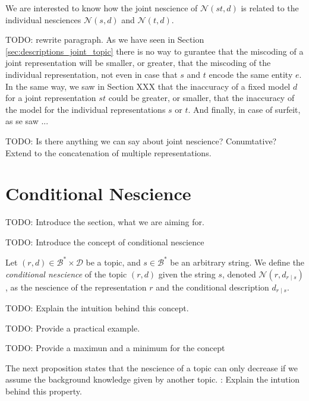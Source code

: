 We are interested to know how the joint nescience of $\mathcal{N} (st, d)$ is related to the individual nesciences $\mathcal{N} (s, d)$ and $\mathcal{N} (t, d)$.

{\color{red} TODO: rewrite paragraph.} As we have seen in Section \ref{sec:descriptions_joint_topic} there is no way to gurantee that the miscoding of a joint representation will be smaller, or greater, that the miscoding of the individual representation, not even in case that $s$ and $t$ encode the same entity $e$. In the same way, we saw in Section {\color{red} XXX} that the inaccuracy of a fixed model $d$ for a joint representation $st$ could be greater, or smaller, that the inaccuracy of the model for the individual representations $s$ or $t$. And finally, in case of surfeit, as se saw ...

{\color{red} TODO: Is there anything we can say about joint nescience? Conumtative? Extend to the concatenation of multiple representations.}

%
%

\section{Conditional Nescience}
\label{sec:conditional_nescience}

{\color{red} TODO: Introduce the section, what we are aiming for.}

{\color{red} TODO: Introduce the concept of conditional nescience}

\begin{definition}
Let $(r, d) \in \mathcal{B}^\ast \times \mathcal{D}$ be a topic, and $s \in \mathcal{B}^\ast$ be an arbitrary string. We define the \emph{conditional nescience} of the topic $(r, d)$ given the string $s$, denoted $\mathcal{N} (r, d_{r \mid s})$, as the nescience of the representation $r$ and the conditional description $d_{r \mid s}$.
\end{definition}

{\color{red} TODO: Explain the intuition behind this concept.}

{\color{red} TODO: Provide a practical example.}

{\color{red} TODO: Provide a maximun and a minimum for the concept}

The next proposition states that the nescience of a topic can only decrease if we assume the background knowledge given by another topic. {\color{red}: Explain the intution behind this property.}

